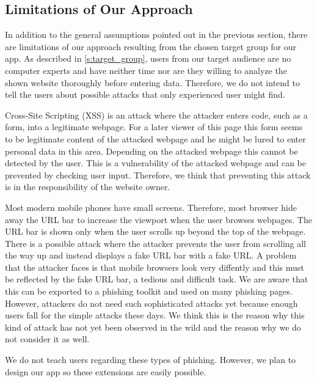 \subsection{Limitations of Our Approach}
In addition to the general assumptions pointed out in the previous section, there are limitations of our approach resulting from the chosen target group for our app.
As described in \autoref{s:target_group}, users from our target audience are no computer experts and have neither time nor are they willing to analyze the shown website thoroughly before entering data.
Therefore, we do not intend to tell the users about possible attacks that only experienced user might find.
\begin{description}[leftmargin=0cm]
	\item[Cross-Site Scripting]
	Cross-Site Scripting (XSS) is an attack where the attacker enters code, such as a form, into a legitimate webpage.
	For a later viewer of this page this form seems to be legitimate content of the attacked webpage and he might be lured to enter personal data in this area. 
	Depending on the attacked webpage this cannot be detected by the user.
	This is a vulnerability of the attacked webpage and can be prevented by checking user input.
	Therefore, we think that preventing this attack is in the responsibility of the website owner.
	\item[URL Hiding Techniques]
	Most modern mobile phones have small screens.
	Therefore, most browser hide away the URL bar to increase the viewport when the user browses webpages.
	The URL bar is shown only when the user scrolls up beyond the top of the webpage.
	There is a possible attack where the attacker prevents the user from scrolling all the way up and instead displays a fake URL bar with a fake URL.
	A problem that the attacker faces is that mobile browsers look very diffently and this must be reflected by the fake URL bar, a tedious and difficult task.
	We are aware that this can be exported to a phishing toolkit and used on many phishing pages. However, attackers do not need such sophisticated attacks yet because enough users fall for the simple attacks these days. 
	We think this is the reason why this kind of attack has not yet been observed in the wild and the reason why we do not consider it as well.
\end{description}

We do not teach users regarding these types of phishing. However, we plan to design our app so these extensions are easily possible.